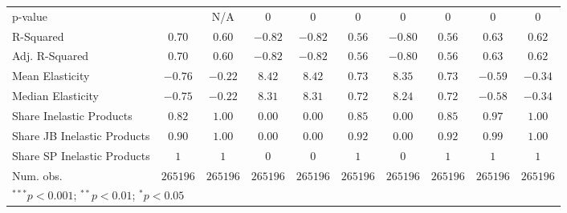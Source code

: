 \begin{tabular}{l c c c c c c c c c}
p-value                     &               & N/A           & 0             & 0             & 0            & 0             & 0            & 0             & 0             \\
R-Squared                   & $0.70$        & $0.60$        & $-0.82$       & $-0.82$       & $0.56$       & $-0.80$       & $0.56$       & $0.63$        & $0.62$        \\
Adj. R-Squared              & $0.70$        & $0.60$        & $-0.82$       & $-0.82$       & $0.56$       & $-0.80$       & $0.56$       & $0.63$        & $0.62$        \\
Mean Elasticity             & $-0.76$       & $-0.22$       & $8.42$        & $8.42$        & $0.73$       & $8.35$        & $0.73$       & $-0.59$       & $-0.34$       \\
Median Elasticity           & $-0.75$       & $-0.22$       & $8.31$        & $8.31$        & $0.72$       & $8.24$        & $0.72$       & $-0.58$       & $-0.34$       \\
Share Inelastic Products    & $0.82$        & $1.00$        & $0.00$        & $0.00$        & $0.85$       & $0.00$        & $0.85$       & $0.97$        & $1.00$        \\
Share JB Inelastic Products & $0.90$        & $1.00$        & $0.00$        & $0.00$        & $0.92$       & $0.00$        & $0.92$       & $0.99$        & $1.00$        \\
Share SP Inelastic Products & $1$           & $1$           & $0$           & $0$           & $1$          & $0$           & $1$          & $1$           & $1$           \\
Num. obs.                   & $265196$      & $265196$      & $265196$      & $265196$      & $265196$     & $265196$      & $265196$     & $265196$      & $265196$      \\
\bottomrule
\multicolumn{10}{l}{\scriptsize{$^{***}p<0.001$; $^{**}p<0.01$; $^{*}p<0.05$}}
\end{tabular}

